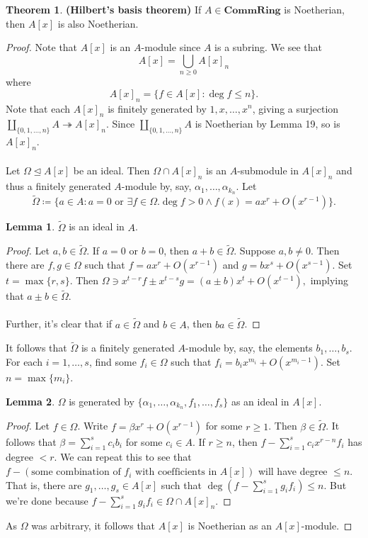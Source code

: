 \documentclass[10pt,letterpaper,cm]{nupset}
\theoremstyle{definition}
\newtheorem{theorem}{Theorem}
\newtheorem{lemma}{Lemma}
\newcommand{\1}{\mathbf{1}}
\newcommand{\0}{\vec 0}
\begin{document}
\begin{theorem}{\textbf{(Hilbert's basis theorem)}} 
If $A\in \mathbf{CommRing}$ is Noetherian, then $A[x]$ is also Noetherian. 
\end{theorem}
\begin{proof}
Note that $A[x]$ is an $A$-module since $A$ is a subring. We see that $$A[x] = \bigcup_{n\geq 0} A[x]_n$$ where $$A[x]_n =  \{f \in A[x] : \deg f \leq n\}  .$$
Note that each $A[x]_n$ is finitely generated by $1, x, \ldots, x^n$, giving a surjection $\coprod_{\{0, 1, \ldots, n\}}A \twoheadrightarrow A[x]_n$. Since $\coprod_{\{0, 1, \ldots, n\}}A$ is Noetherian by Lemma 19, so is $A[x]_n$.
\\ \\ Let $\Omega \unlhd A[x]$ be an ideal. Then $\Omega \cap A[x]_n$ is an $A$-submodule in $A[x]_n$ and thus a finitely generated $A$-module by, say, $\alpha_1, \ldots, \alpha_{k_n}$. Let $$\widetilde{\Omega} \coloneqq  \{a\in A : a = 0 \text{ or } \exists f\in \Omega. \deg f >0 \land f(x) = ax^r+ O(x^{r-1})\}.$$
\begin{lemma}
$\widetilde{\Omega}$ is an ideal in $A$.
\end{lemma}
\begin{proof}
Let $a,b \in \widetilde{\Omega}$. If $a=0$ or $b=0$, then $a+b\in \widetilde{\Omega}$. Suppose $a,b\ne 0$. Then there are $f, g \in 
\Omega$ such that $f= ax^r + O(x^{r-1})$ and $g= bx^s + O(x^{s-1})$. Set $t=\max\{r, s\}$. Then ${\Omega} \ni x^{t-r}f \pm x^{t-s}g = (a\pm b)x^t +O(x^{t-1}),$ implying that $a\pm b \in \widetilde{\Omega}$.
\\ \\
Further, it's clear that if $a\in \widetilde{\Omega}$ and $b\in A$, then $ba\in \widetilde{\Omega}$. 
\end{proof}
It follows that $\widetilde{\Omega}$ is a finitely generated $A$-module by, say, the elements $b_1, \ldots, b_s$. For each $i=1, \ldots, s$, find some $f_i \in \Omega$ such that $f_i = b_ix^{m_i} + O(x^{m_i-1})$. Set $n= \max\{m_i\}$.
\begin{lemma}
$\Omega$ is generated by $\{\alpha_1, \ldots, \alpha_{k_n}, f_1, \ldots, f_s\}$ as an ideal in $A[x]$.
\end{lemma}
\begin{proof}
Let $f\in \Omega$. Write $f = \beta x^r + O(x^{r-1})$ for some $r \geq 1$. Then $\beta \in \widetilde{\Omega}$. It follows that $\beta = \sum_{i=1}^s c_ib_i$ for some $c_i \in A$. If $r \geq n$, then $f -\sum_{i=1}^s c_ix^{r-n}f_i$ has degree $< r$. We can repeat this to see that $f - (\text{some combination of } f_i \text{ with coefficients in } A[x])$ will have degree $\leq n$. That is, there are $g_1, \ldots, g_s \in A[x]$ such that $\deg(f - \sum_{i=1}^sg_if_i) \leq n$. But we're done because $f - \sum_{i=1}^sg_if_i \in \Omega \cap A[x]_n$.
\end{proof}$ $As $\Omega$ was arbitrary, it follows that $A[x]$ is Noetherian as an $A[x]$-module. 
\end{proof}
\end{document}
